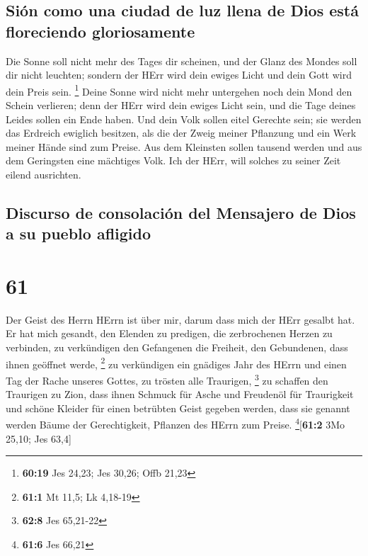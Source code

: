 \hypertarget{siuxf3n-como-una-ciudad-de-luz-llena-de-dios-estuxe1-floreciendo-gloriosamente}{%
\subsection{Sión como una ciudad de luz llena de Dios está floreciendo
gloriosamente}\label{siuxf3n-como-una-ciudad-de-luz-llena-de-dios-estuxe1-floreciendo-gloriosamente}}

 Die Sonne soll nicht mehr des Tages dir scheinen, und
der Glanz des Mondes soll dir nicht leuchten; sondern der HErr wird dein
ewiges Licht und dein Gott wird dein Preis sein. \footnote{\textbf{60:19}
  Jes 24,23; Jes 30,26; Offb 21,23}  Deine Sonne wird
nicht mehr untergehen noch dein Mond den Schein verlieren; denn der HErr
wird dein ewiges Licht sein, und die Tage deines Leides sollen ein Ende
haben.  Und dein Volk sollen eitel Gerechte sein; sie
werden das Erdreich ewiglich besitzen, als die der Zweig meiner
Pflanzung und ein Werk meiner Hände sind zum Preise.  Aus
dem Kleinsten sollen tausend werden und aus dem Geringsten eine
mächtiges Volk. Ich der HErr, will solches zu seiner Zeit eilend
ausrichten.

\hypertarget{discurso-de-consolaciuxf3n-del-mensajero-de-dios-a-su-pueblo-afligido}{%
\subsection{Discurso de consolación del Mensajero de Dios a su pueblo
afligido}\label{discurso-de-consolaciuxf3n-del-mensajero-de-dios-a-su-pueblo-afligido}}

\hypertarget{section-60}{%
\section{61}\label{section-60}}

 Der Geist des Herrn HErrn ist über mir, darum dass mich
der HErr gesalbt hat. Er hat mich gesandt, den Elenden zu predigen, die
zerbrochenen Herzen zu verbinden, zu verkündigen den Gefangenen die
Freiheit, den Gebundenen, dass ihnen geöffnet werde, \footnote{\textbf{61:1}
  Mt 11,5; Lk 4,18-19}  zu verkündigen ein gnädiges Jahr
des HErrn und einen Tag der Rache unseres Gottes, zu trösten alle
Traurigen, \footnote{\textbf{62:8} Jes 65,21-22}  zu
schaffen den Traurigen zu Zion, dass ihnen Schmuck für Asche und
Freudenöl für Traurigkeit und schöne Kleider für einen betrübten Geist
gegeben werden, dass sie genannt werden Bäume der Gerechtigkeit,
Pflanzen des HErrn zum Preise. \footnote{\textbf{61:6} Jes 66,21}{[}\textbf{61:2}
3Mo 25,10; Jes 63,4{]}

